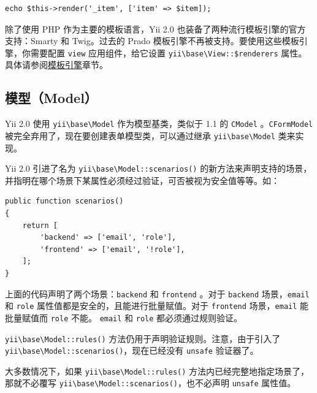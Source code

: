 \lstset{language=php}\begin{lstlisting}
echo $this->render('_item', ['item' => $item]);
\end{lstlisting}
除了使用 PHP 作为主要的模板语言，Yii 2.0 也装备了两种流行模板引擎的官方支持：Smarty 和 Twig。过去的 Prado 模板引擎不再被支持。要使用这些模板引擎，你需要配置 \lstinline|view| 应用组件，给它设置 \texttt{yii{\allowbreak{}\textbackslash}base{\allowbreak{}\textbackslash}View\allowbreak{}::\allowbreak{}\$renderers} 属性。具体请参阅\hyperref[tutorial-template-engines.md]{模板引擎}章节。

\subsection{模型（Model）}
Yii 2.0 使用 \texttt{yii{\allowbreak{}\textbackslash}base{\allowbreak{}\textbackslash}Model} 作为模型基类，类似于 1.1 的 \lstinline|CModel| 。\lstinline|CFormModel| 被完全弃用了，现在要创建表单模型类，可以通过继承 \texttt{yii{\allowbreak{}\textbackslash}base{\allowbreak{}\textbackslash}Model} 类来实现。

Yii 2.0 引进了名为 \texttt{yii{\allowbreak{}\textbackslash}base{\allowbreak{}\textbackslash}Model\allowbreak{}::\allowbreak{}scenarios()} 的新方法来声明支持的场景，并指明在哪个场景下某属性必须经过验证，可否被视为安全值等等。如：

\lstset{language=php}\begin{lstlisting}
public function scenarios()
{
    return [
        'backend' => ['email', 'role'],
        'frontend' => ['email', '!role'],
    ];
}
\end{lstlisting}
上面的代码声明了两个场景：\lstinline|backend| 和 \lstinline|frontend| 。对于 \lstinline|backend| 场景，\lstinline|email| 和 \lstinline|role| 属性值都是安全的，且能进行批量赋值。对于 \lstinline|frontend| 场景，\lstinline|email| 能批量赋值而 \lstinline|role| 不能。 \lstinline|email| 和 \lstinline|role| 都必须通过规则验证。

\texttt{yii{\allowbreak{}\textbackslash}base{\allowbreak{}\textbackslash}Model\allowbreak{}::\allowbreak{}rules()} 方法仍用于声明验证规则。注意，由于引入了 \texttt{yii{\allowbreak{}\textbackslash}base{\allowbreak{}\textbackslash}Model\allowbreak{}::\allowbreak{}scenarios()}，现在已经没有 \lstinline|unsafe| 验证器了。

大多数情况下，如果 \texttt{yii{\allowbreak{}\textbackslash}base{\allowbreak{}\textbackslash}Model\allowbreak{}::\allowbreak{}rules()} 方法内已经完整地指定场景了，那就不必覆写 \texttt{yii{\allowbreak{}\textbackslash}base{\allowbreak{}\textbackslash}Model\allowbreak{}::\allowbreak{}scenarios()}，也不必声明 \lstinline|unsafe| 属性值。

